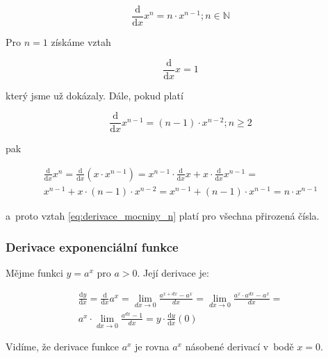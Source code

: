 \begin{equation}
\label{eq:derivace_mocniny_n}
\frac{\mathrm{d}}{\mathrm{d}x} x^n = n \cdot x^{n-1}; n \in \mathbb{N}
\end{equation}

Pro \(n = 1\) získáme vztah 

\begin{equation}
\frac{\mathrm{d}}{\mathrm{d}x} x = 1
\end{equation}

který jsme už dokázaly. Dále, pokud platí 

\begin{equation}
\frac{\mathrm{d}}{\mathrm{d}x} x^{n-1} = (n - 1) \cdot x^{n-2}; n \geq 2
\end{equation}

pak

\begin{equation}
\begin{split}
\frac{\mathrm{d}}{\mathrm{d}x} x^n = \frac{\mathrm{d}}{\mathrm{d}x} (x \cdot x^{n-1}) = x^{n-1} \cdot \frac{\mathrm{d}}{\mathrm{d}x} x + x \cdot \frac{\mathrm{d}}{\mathrm{d}x} x^{n-1} = \\
x^{n-1} + x \cdot (n - 1) \cdot x^{n-2} = x^{n-1} + (n - 1) \cdot x^{n-1} = n \cdot x^{n-1}
\end{split}
\end{equation}

a~proto vztah \eqref{eq:derivace_mocniny_n} platí pro všechna přirozená čísla.

\subsubsection{Derivace exponenciální funkce}

Mějme funkci \(y = a^x\) pro \(a > 0\). Její derivace je:

\begin{equation}
\begin{split}
\frac{\mathrm{d}y}{\mathrm{d}x} = \frac{\mathrm{d}}{\mathrm{d}x} a^x = \lim_{dx \to 0} \frac{a^{x+dx} - a^x}{dx} = \lim_{dx \to 0} \frac{a^x \cdot a^{dx} - a^x}{dx} = \\
a^x \cdot \lim_{dx \to 0} \frac{a^{dx} - 1}{dx} = y \cdot \frac{\mathrm{d}y}{\mathrm{d}x}(0)
\end{split}
\end{equation}

Vidíme, že derivace funkce \(a^x\) je rovna \(a^x\) násobené derivací v~bodě \(x = 0\).

